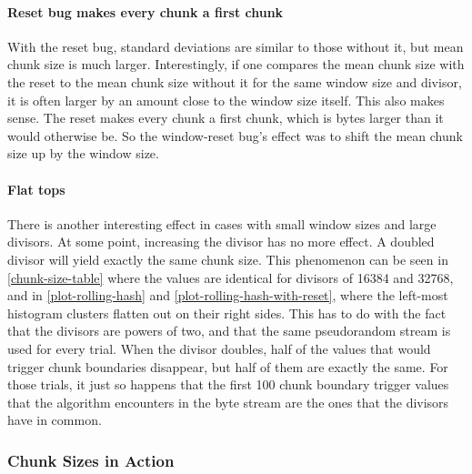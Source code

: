 \paragraph{Reset bug makes every chunk a first chunk}

With the reset bug, standard deviations are similar to those without it, but
mean chunk size is much larger. Interestingly, if one compares the mean chunk
size with the reset to the mean chunk size without it for the same window size
and divisor, it is often larger by an amount close to the window size itself.
This also makes sense. The reset makes every chunk a first chunk, which is
 bytes larger than it would otherwise be. So the
window-reset bug's effect was to shift the mean chunk size up by the window
size.

\paragraph{Flat tops}

There is another interesting effect in cases with small window sizes and large
divisors. At some point, increasing the divisor has no more effect. A doubled
divisor will yield exactly the same chunk size. This phenomenon can be seen in
\autoref{chunk-size-table} where the values are identical for divisors of
\num{16384} and \num{32768}, and in \autoref{plot-rolling-hash} and
\autoref{plot-rolling-hash-with-reset}, where the left-most histogram clusters
flatten out on their right sides. This has to do with the fact that the divisors
are powers of two, and that the same pseudorandom stream is used for every
trial. When the divisor doubles, half of the values that would trigger chunk
boundaries disappear, but half of them are exactly the same. For those trials,
it just so happens that the first \num{100} chunk boundary trigger values that
the algorithm encounters in the byte stream are the ones that the divisors have
in common.

%


\subsubsection{Chunk Sizes in Action}

